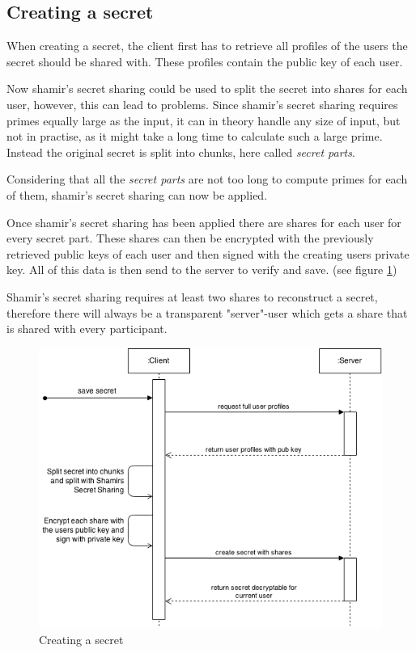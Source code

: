 \subsection{Creating a secret}

When creating a secret, the client first has to retrieve all profiles of the
users the secret should be shared with. These profiles contain the public key
of each user.

Now shamir's secret sharing could be used to split the secret into shares for
each user, however, this can lead to problems. Since shamir's secret sharing
requires primes equally large as the input, it can in theory handle any size of
input, but not in practise, as it might take a long time to calculate such a
large prime. Instead the original secret is split into chunks, here called
\textit{secret parts}.

Considering that all the \textit{secret parts} are not too long to compute
primes for each of them, shamir's secret sharing can now be applied.

Once shamir's secret sharing has been applied there are shares for each user
for every secret part. These shares can then be encrypted with the previously
retrieved public keys of each user and then signed with the creating users
private key. All of this data is then send to the server to verify and save.
(see figure \ref{fig:creating_a_secret})

Shamir's secret sharing requires at least two shares to reconstruct a secret,
therefore there will always be a transparent "server"-user which gets a share
that is shared with every participant.

\begin{figure}
  \includegraphics[scale=0.55]{pictures/create_secret_sequence_diagram.png}
  \caption{Creating a secret}
  \label{fig:creating_a_secret}
\end{figure}

